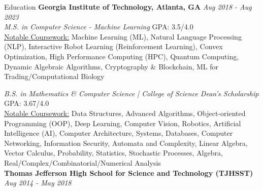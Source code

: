 \documentclass{template} %
\begin{document}

\begin{rSection}{Education}
{\bf Georgia Institute of Technology, Atlanta, GA} \hfill {\em Aug 2018 - Aug 2023}
\\ {\em M.S. in Computer Science - Machine Learning} \hfill  GPA: 3.5/4.0
\vspace{0.1cm}
\\ \underline{Notable Coursework:} Machine Learning (ML), Natural Language Processing (NLP), Interactive Robot Learning (Reinforcement Learning), Convex Optimization, High Performance Computing (HPC), Quantum Computing, Dynamic Algebraic Algorithms, Cryptography \& Blockchain, ML for Trading/Computational Biology 

{\em B.S. in Mathematics \& Computer Science | College of Science Dean's Scholarship} \hfill  GPA: 3.67/4.0
\vspace{0.1cm}
\\ \underline{Notable Coursework:} Data Structures, Advanced Algorithms, Object-oriented Programming (OOP), Deep Learning, Computer Vision, Robotics, Artificial Intelligence (AI), Computer Architecture, Systems, Databases, Computer Networking, Information Security, Automata and Complexity, Linear Algebra, Vector Calculus, Probability, Statistics, Stochastic Processes, Algebra, Real/Complex/Combinatorial/Numerical Analysis
\vspace{0.20cm}
\\ {\bf Thomas Jefferson High School for Science and Technology (TJHSST)} \hfill {\em Aug 2014 - May 2018}
\end{rSection}

\end{document}
